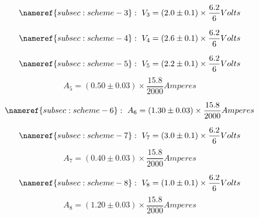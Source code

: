 \documentclass[11pt]{memoir}
\newcommand{\initialCurrentDispersion}{0.03}
\newcommand{\initialVoltageDispersion}{0.1}
\newcommand{\voltageConvertingFrac}{\frac{6.2}{6}}
\newcommand{\currentConvertingFrac}{\frac{15.8}{2000}}
\begin{document}
    \begin{equation*}
        \nameref{subsec:scheme-3}: ~
        V_3 = \left( 2.0 \pm \initialVoltageDispersion \right) \times \voltageConvertingFrac Volts
    \end{equation*}

    \begin{equation*}
        \nameref{subsec:scheme-4}: ~
        V_4 = \left( 2.6 \pm \initialVoltageDispersion \right) \times \voltageConvertingFrac Volts
    \end{equation*}

    \begin{equation*}
        \nameref{subsec:scheme-5}: ~
        V_5 = \left( 2.2 \pm \initialVoltageDispersion \right) \times \voltageConvertingFrac Volts
    \end{equation*}
    \begin{equation*}
        A_5 = \left( 0.50 \pm \initialCurrentDispersion \right) \times \currentConvertingFrac Amperes
    \end{equation*}

    \begin{equation*}
        \nameref{subsec:scheme-6}: ~
        A_6 = \left( 1.30 \pm \initialCurrentDispersion \right) \times \currentConvertingFrac Amperes
    \end{equation*}

    \begin{equation*}
        \nameref{subsec:scheme-7}: ~
        V_7 = \left( 3.0 \pm \initialVoltageDispersion \right) \times \voltageConvertingFrac Volts
    \end{equation*}
    \begin{equation*}
        A_7 = \left( 0.40 \pm \initialCurrentDispersion \right) \times \currentConvertingFrac Amperes
    \end{equation*}

    \begin{equation*}
        \nameref{subsec:scheme-8}: ~
        V_8 = \left( 1.0 \pm \initialVoltageDispersion \right) \times \voltageConvertingFrac Volts
    \end{equation*}
    \begin{equation*}
        A_8 = \left( 1.20 \pm \initialCurrentDispersion \right) \times \currentConvertingFrac Amperes
    \end{equation*}
\end{document}
